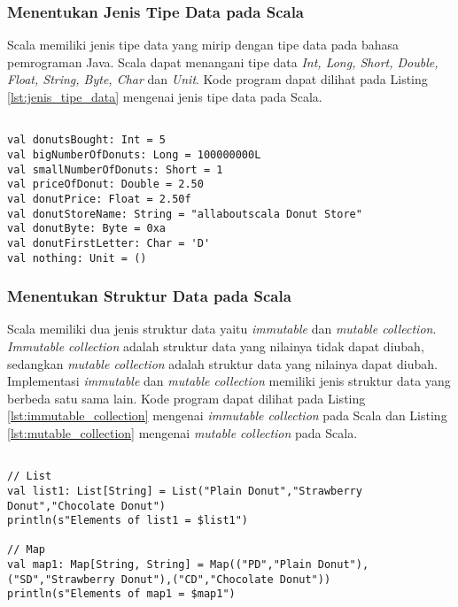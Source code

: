 \subsubsection{Menentukan Jenis Tipe Data pada Scala}
Scala memiliki jenis tipe data yang mirip dengan tipe data pada bahasa pemrograman Java. Scala dapat menangani tipe data \textit{Int, Long, Short, Double, Float, String, Byte, Char} dan \textit{Unit}. Kode program dapat dilihat pada Listing \ref{lst:jenis_tipe_data} mengenai jenis tipe data pada Scala.

\begin{lstlisting}[basicstyle=\ttfamily, frame=single,
	columns=fullflexible, keepspaces=true, breaklines=true, label=lst:jenis_tipe_data, caption=Menentukan Jenis Tipe Data pada Scala]
	
val donutsBought: Int = 5
val bigNumberOfDonuts: Long = 100000000L
val smallNumberOfDonuts: Short = 1
val priceOfDonut: Double = 2.50
val donutPrice: Float = 2.50f
val donutStoreName: String = "allaboutscala Donut Store"
val donutByte: Byte = 0xa
val donutFirstLetter: Char = 'D'
val nothing: Unit = ()

\end{lstlisting}

\newpage
\subsubsection{Menentukan Struktur Data pada Scala}
Scala memiliki dua jenis struktur data yaitu \textit{immutable} dan \textit{mutable collection}. \textit{Immutable collection} adalah struktur data yang nilainya tidak dapat diubah, sedangkan \textit{mutable collection} adalah struktur data yang nilainya dapat diubah. Implementasi \textit{immutable} dan \textit{mutable collection} memiliki jenis struktur data yang berbeda satu sama lain. Kode program dapat dilihat pada Listing \ref{lst:immutable_collection} mengenai \textit{immutable collection} pada Scala dan Listing \ref{lst:mutable_collection} mengenai \textit{mutable collection} pada Scala.

\begin{lstlisting}[basicstyle=\ttfamily, frame=single,
	columns=fullflexible, keepspaces=true, breaklines=true, label=lst:immutable_collection, caption=Membuat immutable collection pada Scala]
	
// List
val list1: List[String] = List("Plain Donut","Strawberry Donut","Chocolate Donut")
println(s"Elements of list1 = $list1")

// Map
val map1: Map[String, String] = Map(("PD","Plain Donut"),("SD","Strawberry Donut"),("CD","Chocolate Donut"))
println(s"Elements of map1 = $map1")

\end{lstlisting}

